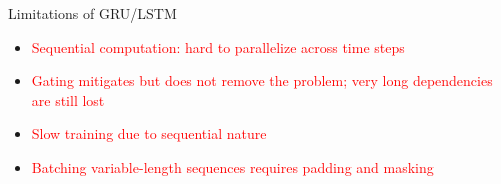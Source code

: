 \begin{frame}{Limitations of GRU/LSTM}
  \small
  \begin{itemize}
    \item \textcolor{red}{Sequential computation: hard to parallelize across time steps}
    \item \textcolor{red}{Gating mitigates but does not remove the problem; very long dependencies are still lost}
    \item \textcolor{red}{Slow training due to sequential nature}
    \item \textcolor{red}{Batching variable-length sequences requires padding and masking}
  \end{itemize}
\end{frame}
